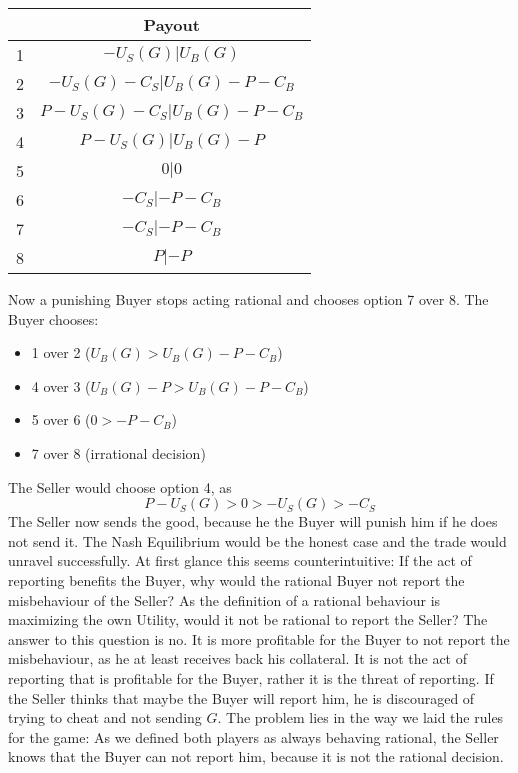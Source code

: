 \documentclass{cacthesis}
\begin{document}
\begin{center}
\begin{tabular}{ |c|c| }
\hline
& Payout  \\
\hline
\hline
1& $-U_S(G) | U_B(G)$\\
\hline
2& $-U_S(G) - C_S| U_B(G)- P - C_B $\\
\hline
3&$P-U_S(G) - C_S | U_B(G) -P - C_B$ \\
\hline
4& $P-U_S(G)| U_B(G)-P$\\
\hline
5& $0|0$\\
\hline 
6& $-C_S |-P - C_B$\\
\hline
7& $- C_S| -P-C_B$\\
\hline
8& $P| -P$\\
\hline
\end{tabular}
\end{center}
Now a punishing Buyer stops acting rational and chooses option 7 over 8.\newline
The Buyer chooses:
\begin{itemize}
    \item 1 over 2 ($U_B(G) > U_B(G) -P -C_B$)
    \item 4 over 3 ($U_B(G) - P > U_B(G) -P -C_B$)
    \item 5 over 6 ($0 > -P -C_B$)
    \item 7 over 8 (irrational decision)
\end{itemize}
The Seller would choose option 4, as 
\[P-U_S(G)>0>-U_S(G)>-C_S\]
The Seller now sends the good, because he the Buyer will punish him if he does not send it.
The Nash Equilibrium would be the honest case and the trade would unravel successfully.\newline
At first glance this seems counterintuitive: If the act of reporting benefits the Buyer, why would the rational Buyer not report the misbehaviour of the Seller? As the definition of a rational behaviour is maximizing the own Utility, would it not be rational to report the Seller?\newline
The answer to this question is no. It is more profitable for the Buyer to not report the misbehaviour, as he at least receives back his collateral.\newline
It is not the act of reporting that is profitable for the Buyer, rather it is the threat of reporting. If the Seller thinks that maybe the Buyer will report him, he is discouraged of trying to cheat and not sending $G$.\newline
The problem lies in the way we laid the rules for the game: As we defined both players as always behaving rational, the Seller knows that the Buyer can not report him, because it is not the rational decision.\newline
\end{document}
